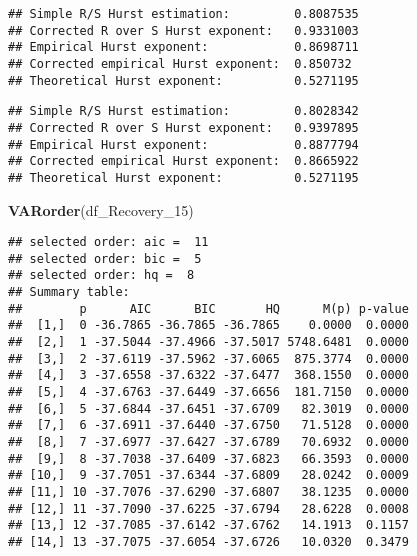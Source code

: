 \documentclass[
]{article}
\newenvironment{Shaded}{\begin{snugshade}}{\end{snugshade}}
\newcommand{\FunctionTok}[1]{\textcolor[rgb]{0.13,0.29,0.53}{\textbf{#1}}}
\newcommand{\NormalTok}[1]{#1}
\newcommand{\SpecialCharTok}[1]{\textcolor[rgb]{0.81,0.36,0.00}{\textbf{#1}}}
\begin{document}
\begin{verbatim}
## Simple R/S Hurst estimation:         0.8087535 
## Corrected R over S Hurst exponent:   0.9331003 
## Empirical Hurst exponent:            0.8698711 
## Corrected empirical Hurst exponent:  0.850732 
## Theoretical Hurst exponent:          0.5271195
\end{verbatim}

\begin{Shaded}
\end{Shaded}

\begin{verbatim}
## Simple R/S Hurst estimation:         0.8028342 
## Corrected R over S Hurst exponent:   0.9397895 
## Empirical Hurst exponent:            0.8877794 
## Corrected empirical Hurst exponent:  0.8665922 
## Theoretical Hurst exponent:          0.5271195
\end{verbatim}

\begin{Shaded}
\begin{Highlighting}[]
\FunctionTok{VARorder}\NormalTok{(df\_Recovery\_15)}
\end{Highlighting}
\end{Shaded}

\begin{verbatim}
## selected order: aic =  11 
## selected order: bic =  5 
## selected order: hq =  8 
## Summary table:  
##        p      AIC      BIC       HQ      M(p) p-value
##  [1,]  0 -36.7865 -36.7865 -36.7865    0.0000  0.0000
##  [2,]  1 -37.5044 -37.4966 -37.5017 5748.6481  0.0000
##  [3,]  2 -37.6119 -37.5962 -37.6065  875.3774  0.0000
##  [4,]  3 -37.6558 -37.6322 -37.6477  368.1550  0.0000
##  [5,]  4 -37.6763 -37.6449 -37.6656  181.7150  0.0000
##  [6,]  5 -37.6844 -37.6451 -37.6709   82.3019  0.0000
##  [7,]  6 -37.6911 -37.6440 -37.6750   71.5128  0.0000
##  [8,]  7 -37.6977 -37.6427 -37.6789   70.6932  0.0000
##  [9,]  8 -37.7038 -37.6409 -37.6823   66.3593  0.0000
## [10,]  9 -37.7051 -37.6344 -37.6809   28.0242  0.0009
## [11,] 10 -37.7076 -37.6290 -37.6807   38.1235  0.0000
## [12,] 11 -37.7090 -37.6225 -37.6794   28.6228  0.0008
## [13,] 12 -37.7085 -37.6142 -37.6762   14.1913  0.1157
## [14,] 13 -37.7075 -37.6054 -37.6726   10.0320  0.3479
\end{verbatim}
\end{document}
